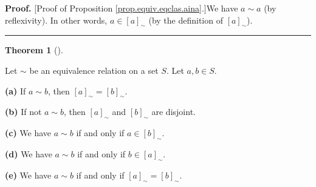 \documentclass[numbers=enddot,12pt,final,onecolumn,notitlepage]{scrartcl}%
\numberwithin{exer}{subsection}
\theoremstyle{definition}
\newtheorem{theo}{Theorem}[subsection]
\newenvironment{theorem}[1][]
{\begin{theo}[#1]\begin{leftbar}}
{\end{leftbar}\end{theo}}
\newenvironment{proof}[1][Proof]{\noindent\textbf{#1.} }{\ \rule{0.5em}{0.5em}}
\begin{document}
\begin{proof}
[Proof of Proposition \ref{prop.equiv.eqclas.aina}.]We have $a\sim a$ (by
reflexivity). In other words, $a\in\left[  a\right]  _{\sim}$ (by the
definition of $\left[  a\right]  _{\sim}$).
\end{proof}

\begin{theorem}
\label{thm.equiv.eqclas.disj}Let $\sim$ be an equivalence relation on a set
$S$. Let $a,b\in S$.

\textbf{(a)} If $a\sim b$, then $\left[  a\right]  _{\sim}=\left[  b\right]
_{\sim}$.

\textbf{(b)} If not $a\sim b$, then $\left[  a\right]  _{\sim}$ and $\left[
b\right]  _{\sim}$ are disjoint.

\textbf{(c)} We have $a\sim b$ if and only if $a\in\left[  b\right]  _{\sim}$.

\textbf{(d)} We have $a\sim b$ if and only if $b\in\left[  a\right]  _{\sim}$.

\textbf{(e)} We have $a\sim b$ if and only if $\left[  a\right]  _{\sim
}=\left[  b\right]  _{\sim}$.
\end{theorem}
\end{document}
